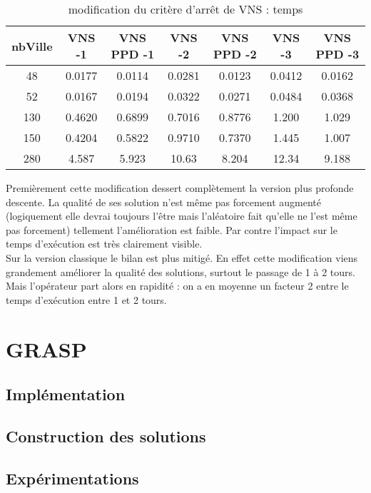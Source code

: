 \documentclass[12pt,a4paper]{article}
\begin{document}
\begin{table}[!h]
\centering
\begin{tabular}{|*{7}{c|}}
  \hline
  nbVille & VNS -1 & VNS PPD -1 & VNS -2 & VNS PPD -2 & VNS -3 & VNS PPD -3 \\
  \hline
  48 & 0.0177 & 0.0114 & 0.0281 & 0.0123 & 0.0412 & 0.0162 \\ 
  52 & 0.0167 & 0.0194 & 0.0322 & 0.0271 & 0.0484 & 0.0368 \\
  130 & 0.4620 & 0.6899 & 0.7016 & 0.8776 & 1.200 & 1.029 \\
  150 & 0.4204 & 0.5822 & 0.9710 & 0.7370 & 1.445 & 1.007 \\  
  280 & 4.587 & 5.923 & 10.63 & 8.204 & 12.34 & 9.188 \\
  \hline
\end{tabular}
\caption{modification du critère d’arrêt de VNS : temps}
\label{stopingRuleVNStemps}
\end{table}

Premièrement cette modification dessert complètement la version plus profonde descente. La qualité de ses solution n'est même pas forcement augmenté (logiquement elle devrai toujours l’être mais l’aléatoire fait qu'elle ne l'est même pas forcement) tellement l’amélioration est faible. Par contre l'impact sur le temps d’exécution est très clairement visible.\\

Sur la version classique le bilan est plus mitigé. En effet cette modification viens grandement améliorer la qualité des solutions, surtout le passage de 1 à 2 tours. Mais l'opérateur part alors en rapidité : on a en moyenne un facteur 2 entre le temps d’exécution entre 1 et 2 tours.\\ 

\section{GRASP}

\subsection{Implémentation}

\subsection{Construction des solutions}

\subsection{Expérimentations}
\end{document}
